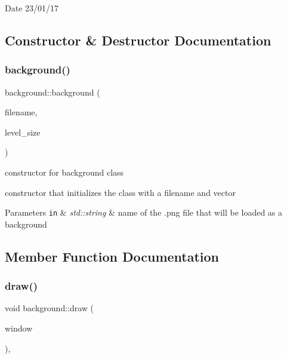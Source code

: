 \begin{DoxyDate}{Date}
23/01/17 
\end{DoxyDate}


\subsection{Constructor \& Destructor Documentation}
\mbox{\label{classbackground_ad199eead2ef4a4d867f2542d3a152471}} 
\subsubsection{\texorpdfstring{background()}{background()}}
{\footnotesize\ttfamily background\+::background (\begin{DoxyParamCaption}\item[{std\+::string}]{filename,  }\item[{sf\+::\+Vector2f}]{level\+\_\+size }\end{DoxyParamCaption})}



constructor for background class 

constructor that initializes the class with a filename and vector


\begin{DoxyParams}[1]{Parameters}
\mbox{\tt in}  & {\em std\+::string} & name of the .png file that will be loaded as a background \\
\hline
\end{DoxyParams}


\subsection{Member Function Documentation}
\mbox{\label{classbackground_a41736f9a00defad1e84b3a8099c887e2}} 
\subsubsection{\texorpdfstring{draw()}{draw()}}
{\footnotesize\ttfamily void background\+::draw (\begin{DoxyParamCaption}\item[{sf\+::\+Render\+Window \&}]{window }\end{DoxyParamCaption})\hspace{0.3cm}{\ttfamily [override]}, {\ttfamily [virtual]}}



